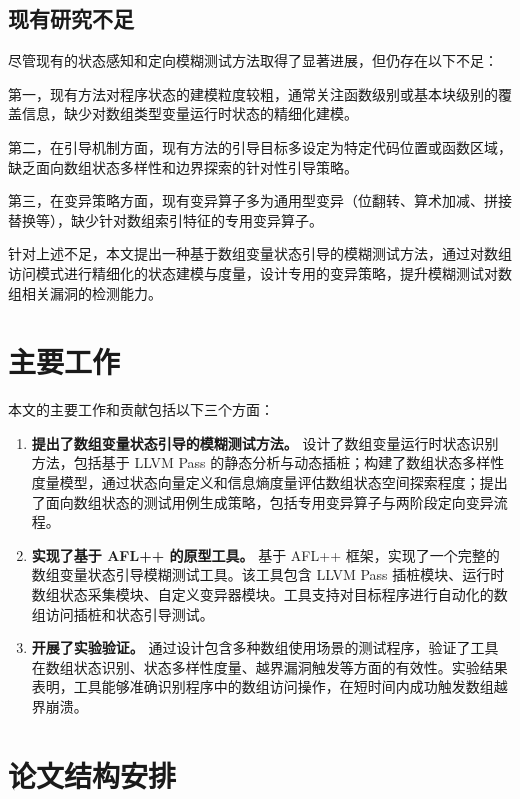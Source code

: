 \documentclass[bachelor]{njupthesis}
\begin{document}
\subsection{现有研究不足}

尽管现有的状态感知和定向模糊测试方法取得了显著进展，但仍存在以下不足：

第一，现有方法对程序状态的建模粒度较粗，通常关注函数级别或基本块级别的覆盖信息，缺少对数组类型变量运行时状态的精细化建模。

第二，在引导机制方面，现有方法的引导目标多设定为特定代码位置或函数区域，缺乏面向数组状态多样性和边界探索的针对性引导策略。

第三，在变异策略方面，现有变异算子多为通用型变异（位翻转、算术加减、拼接替换等），缺少针对数组索引特征的专用变异算子。

针对上述不足，本文提出一种基于数组变量状态引导的模糊测试方法，通过对数组访问模式进行精细化的状态建模与度量，设计专用的变异策略，提升模糊测试对数组相关漏洞的检测能力。

\section{主要工作}

本文的主要工作和贡献包括以下三个方面：

\begin{enumerate}
    \item \textbf{提出了数组变量状态引导的模糊测试方法。} 设计了数组变量运行时状态识别方法，包括基于 LLVM Pass 的静态分析与动态插桩；构建了数组状态多样性度量模型，通过状态向量定义和信息熵度量评估数组状态空间探索程度；提出了面向数组状态的测试用例生成策略，包括专用变异算子与两阶段定向变异流程。
    \item \textbf{实现了基于 AFL++ 的原型工具。} 基于 AFL++ 框架，实现了一个完整的数组变量状态引导模糊测试工具。该工具包含 LLVM Pass 插桩模块、运行时数组状态采集模块、自定义变异器模块。工具支持对目标程序进行自动化的数组访问插桩和状态引导测试。
    \item \textbf{开展了实验验证。} 通过设计包含多种数组使用场景的测试程序，验证了工具在数组状态识别、状态多样性度量、越界漏洞触发等方面的有效性。实验结果表明，工具能够准确识别程序中的数组访问操作，在短时间内成功触发数组越界崩溃。
\end{enumerate}

\section{论文结构安排}
\end{document}

